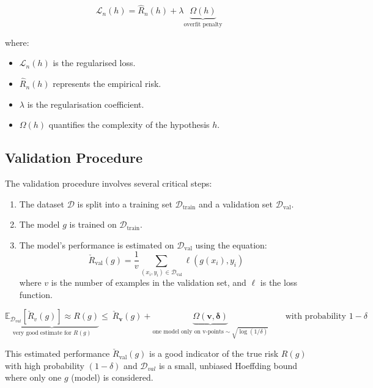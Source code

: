 \begin{equation}
    \mathcal{L}_n (h) = \hat{R}_n (h) + \lambda \underbrace{\Omega(h)}_{\text{overfit penalty}}
\end{equation}



where:
\begin{itemize}
    \item \( \mathcal{L}_n (h) \) is the regularised loss.
    \item \( \hat{R}_n (h) \) represents the empirical risk.
    \item \( \lambda \) is the regularisation coefficient.
    \item \( \Omega(h) \) quantifies the complexity of the hypothesis \( h \).
\end{itemize}

\subsection{Validation Procedure}
The validation procedure involves several critical steps:
\begin{enumerate}
    \item The dataset \( \mathcal{D} \) is split into a training set \( \mathcal{D}_{\text{train}} \) and a validation set \( \mathcal{D}_{\text{val}} \).
    \item The model \( g \) is trained on \( \mathcal{D}_{\text{train}} \).
    \item The model's performance is estimated on \( \mathcal{D}_{\text{val}} \) using the equation:
    \begin{equation}
        \check{R}_{\text{val}} (g) = \frac{1}{v} \sum_{(x_i,y_i) \in \mathcal{D}_{\text{val}}} \ell(g(x_i), y_i)
    \end{equation}
    where \( v \) is the number of examples in the validation set, and \( \ell \) is the loss function.
\end{enumerate}
\begin{equation}
    \underbrace{\mathbb{E}_{\mathcal{D}_{{val}}}\left[\check{R}_{{v}}(g)\right]\approx R(g)}_{\text{very good estimate for }R(g)}\leqslant\ \check{R}_{\mathbf{v}}(g)+ \underbrace{\Omega(\mathbf{v},\mathbf{\delta})}_{\text{one model only on v-points} \sim \sqrt{\log (1/\delta)}} \quad \quad \text{with probability } 1-\delta
\end{equation}

This estimated performance \( \check{R}_{\text{val}} (g) \) is a good indicator of the true risk \( R(g) \) with high probability \( (1 - \delta) \) and $\mathcal{D}_{val}$ is a small, unbiased Hoeffding bound where only one $g$ (model) is considered. 

